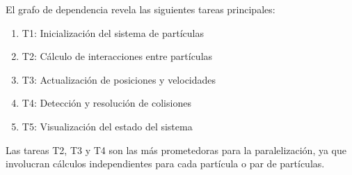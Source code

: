 \documentclass[12pt,a4paper]{article}
\begin{document}
	El grafo de dependencia revela las siguientes tareas principales:
	\begin{enumerate}
		\item T1: Inicialización del sistema de partículas
		\item T2: Cálculo de interacciones entre partículas
		\item T3: Actualización de posiciones y velocidades
		\item T4: Detección y resolución de colisiones
		\item T5: Visualización del estado del sistema
	\end{enumerate}
	
	Las tareas T2, T3 y T4 son las más prometedoras para la paralelización, ya que involucran cálculos independientes para cada partícula o par de partículas.
	
\end{document}
